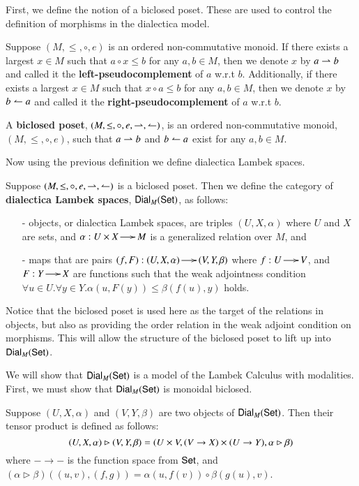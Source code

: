 First, we define the notion of a biclosed poset.  These are used to
control the definition of morphisms in the dialectica model.
\begin{definition}
  \label{def:biclosed-poset}
  Suppose $(M, \leq, \circ, e)$ is an ordered non-commutative monoid.
  If there exists a largest $x \in M$ such that $a \circ x \leq b$ for
  any $a, b \in M$, then we denote $x$ by $a \lto b$ and called it
  the \textbf{left-pseudocomplement} of $a$ w.r.t $b$.  Additionally,
  if there exists a largest $x \in M$ such that $x \circ a \leq b$ for
  any $a, b \in M$, then we denote $x$ by $b \rto a$ and called it
  the \textbf{right-pseudocomplement} of $a$ w.r.t $b$.

  A \textbf{biclosed poset}, $(M, \leq, \circ, e, \lto, \rto)$, is an
  ordered non-commutative monoid, $(M, \leq, \circ, e)$, such that $a
  \lto b$ and $b \rto a$ exist for any $a,b \in M$.
\end{definition}
Now using the previous definition we define dialectica Lambek spaces.
\begin{definition}
  \label{def:dialectica-lambek-spaces}
  Suppose $(M, \leq, \circ, e, \lto, \rto)$ is a biclosed poset. Then
  we define the category of \textbf{dialectica Lambek spaces},
  $\mathsf{Dial}_M(\Set)$, as follows:
  \begin{itemize}
  \item[-] objects, or dialectica Lambek spaces, are triples $(U, X,
    \alpha)$ where $U$ and $X$ are sets, and $\alpha : U \times X \mto
    M$ is a generalized relation over $M$, and

  \item[-] maps that are pairs $(f, F) : (U , X, \alpha) \mto (V , Y ,
    \beta)$ where $f : U \mto V$, and $F : Y \mto X$ are functions
    such that the weak adjointness condition
    $\forall u \in U.\forall y \in Y. \alpha(u , F(y)) \leq \beta(f(u), y)$
    holds.
  \end{itemize}
\end{definition}
Notice that the biclosed poset is used here as the target of the
relations in objects, but also as providing the order  relation in the weak adjoint condition on morphisms.  This will allow the structure of the biclosed
poset to lift up into $\Dial{M}{\Set}$.

We will show that $\Dial{M}{\Set}$ is a model of the Lambek Calculus
with modalities.  First, we must show that $\Dial{M}{\Set}$ is
monoidal biclosed.
\begin{definition}
  \label{def:dial-monoidal-structure}
  Suppose $(U, X, \alpha)$ and $(V, Y, \beta)$ are two objects of
  $\Dial{M}{\Set}$. Then their tensor product is defined as follows:
  \[ \small
  (U, X, \alpha) \rhd (V, Y, \beta) = (U \times V, (V \to X) \times (U \to Y), \alpha \rhd \beta)
  \]
  where $- \to -$ is the function space from $\Set$, and $(\alpha
  \rhd \beta)((u, v), (f, g)) = \alpha(u, f(v)) \circ \beta(g(u), v)$.
\end{definition}

